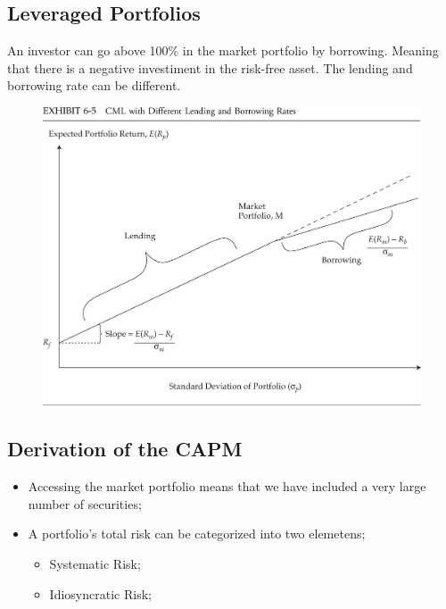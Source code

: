 \documentclass[11pt,a4paper]{report}
\begin{document}
\subsection{Leveraged Portfolios}
An investor can go above 100\% in the market portfolio by borrowing. Meaning that there is a negative investiment in the risk-free asset. The lending and borrowing rate can be different.
\begin{figure}[h]
    \centering
    \includegraphics[width=\textwidth]{images/cml risk return w_borrowinglending.jpg}
\end{figure}
\subsection{Derivation of the CAPM}
\begin{itemize}
    \item Accessing the market portfolio means that we have included a very large number of securities;
    \item A portfolio's total risk can be categorized into two elemetens;
    \begin{itemize}
        \item Systematic Risk;
        \item Idiosyncratic Risk;
    \end{itemize}
\end{itemize}
\end{document}
